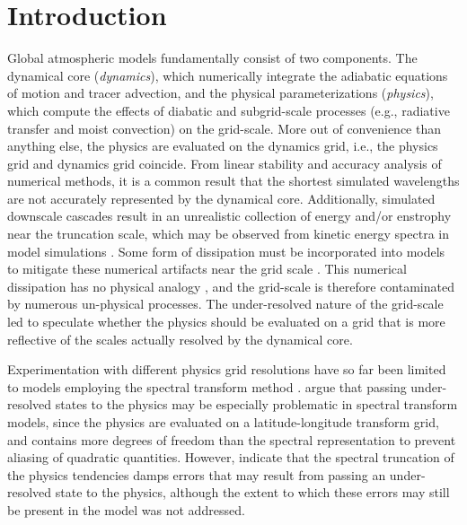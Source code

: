 \documentclass{agujournal}
\begin{document}

\section{Introduction}\label{sec:intro}

Global atmospheric models fundamentally consist of two components. The dynamical core ({\em{dynamics}}), which numerically integrate the adiabatic equations of motion and tracer advection, and the physical parameterizations ({\em{physics}}), which compute the effects of diabatic and subgrid-scale processes (e.g., radiative transfer and moist convection) on the grid-scale. More out of convenience than anything else, the physics are evaluated on the dynamics grid, i.e., the physics grid and dynamics grid coincide. From linear stability and accuracy analysis of numerical methods, it is a common result that the shortest simulated wavelengths are not accurately represented by the dynamical core. Additionally, simulated downscale cascades result in an unrealistic collection of energy and/or enstrophy near the truncation scale, which may be observed from kinetic energy spectra in model simulations \citep{S2011LNCSE}. Some form of dissipation must be incorporated into models to mitigate these numerical artifacts near the grid scale \citep{JW2010LNCSE}. This numerical dissipation has no physical analogy \citep[although see][]{GMR2007}, and the grid-scale is therefore contaminated by numerous un-physical processes. The under-resolved nature of the grid-scale led \cite{LH1997MWR} to speculate whether the physics should be evaluated on a grid that is more reflective of the scales actually resolved by the dynamical core.

Experimentation with different physics grid resolutions have so far been limited to models employing the spectral transform method \citep{LH1997MWR,W1999T,W2014PTRSL}. \cite{LH1997MWR} argue that passing under-resolved states to the physics may be especially problematic in spectral transform models, since the physics are evaluated on a latitude-longitude transform grid, and contains more degrees of freedom than the spectral representation to prevent aliasing of quadratic quantities. However, \cite{LH1997MWR} indicate that the spectral truncation of the physics tendencies damps errors that may result from passing an under-resolved state to the physics, although the extent to which these errors may still be present in the model was not addressed. 
\end{document}
